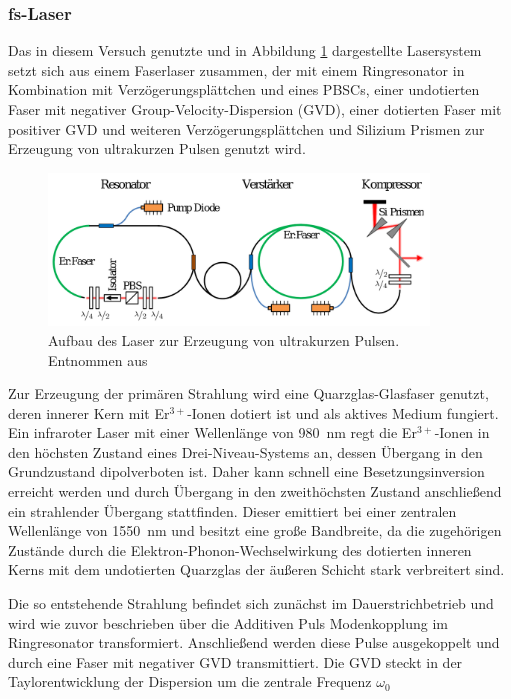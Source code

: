     \newpage
    \subsubsection{fs-Laser}

      Das in diesem Versuch genutzte und in Abbildung \ref{fig:Laser} dargestellte Lasersystem setzt sich aus einem Faserlaser zusammen, der mit einem Ringresonator in Kombination mit Verzögerungsplättchen 
      und eines PBSCs, einer undotierten Faser mit negativer Group-Velocity-Dispersion (GVD), einer dotierten Faser mit positiver GVD und weiteren Verzögerungsplättchen und Silizium Prismen zur Erzeugung von
      ultrakurzen Pulsen genutzt wird. 

      \FloatBarrier
      \begin{figure}[h]
        \centering
        \includegraphics[width = 0.9\textwidth]{pictures/Laser.png}
        \caption{Aufbau des Laser zur Erzeugung von ultrakurzen Pulsen. Entnommen aus \cite{toptica}}
        \label{fig:Laser}
      \end{figure}
      \FloatBarrier

      Zur Erzeugung der primären Strahlung wird eine Quarzglas-Glasfaser genutzt, deren innerer Kern mit Er$^{3+}$-Ionen dotiert ist und als aktives Medium fungiert. Ein infraroter Laser mit einer Wellenlänge von 
      \SI{980}{\nano\metre} regt die Er$^{3+}$-Ionen in den höchsten Zustand eines Drei-Niveau-Systems an, dessen Übergang in den Grundzustand dipolverboten ist. Daher kann schnell eine Besetzungsinversion
      erreicht werden und durch Übergang in den zweithöchsten Zustand anschließend ein strahlender Übergang stattfinden. Dieser emittiert bei einer zentralen Wellenlänge von \SI{1550}{\nano\metre} und besitzt 
      eine große Bandbreite, da die zugehörigen Zustände durch die Elektron-Phonon-Wechselwirkung des dotierten inneren Kerns mit dem undotierten Quarzglas der äußeren Schicht stark verbreitert sind.
      
      Die so entstehende Strahlung befindet sich zunächst im Dauerstrichbetrieb und wird wie zuvor beschrieben über die Additiven Puls Modenkopplung im Ringresonator transformiert. Anschließend werden diese 
      Pulse ausgekoppelt und durch eine Faser mit negativer GVD transmittiert. Die GVD steckt in der Taylorentwicklung der Dispersion um die zentrale Frequenz $\omega_0$
      
